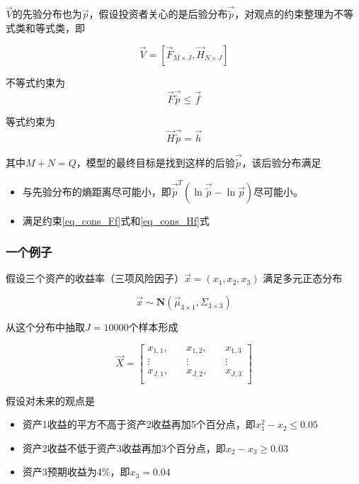 $\vec{V}$的先验分布也为$\vec{p}$，假设投资者关心的是后验分布$\vec{\tilde{p}}$，对观点的约束整理为不等式类和等式类，即

\begin{equation}
    \vec{V} = [\vec{F}_{M\times J}, \vec{H}_{N\times J}]
\end{equation}

不等式约束为
\begin{equation}\label{eq_cons_Ff}
    \vec{F}\vec{\tilde{p}} \leq \vec{f}
\end{equation}

等式约束为
\begin{equation}\label{eq_cons_Hf}
    \vec{H}\vec{\tilde{p}} = \vec{h}
\end{equation}

其中$M+N=Q$，模型的最终目标是找到这样的后验$\vec{\tilde{p}}$，该后验分布满足
\begin{itemize}
    \item 与先验分布的熵距离尽可能小，即$\vec{\tilde{p}}^T(\ln\vec{\tilde{p}}-\ln\vec{p})$尽可能小。
    \item 满足约束\ref{eq_cons_Ff}式和\ref{eq_cons_Hf}式
\end{itemize}

\subsubsection{一个例子}
假设三个资产的收益率（三项风险因子）$\vec{x}=(x_1,x_2,x_3)$ 满足多元正态分布

\begin{equation}
    \vec{x} \sim \mathbf{N}(\vec{\mu}_{3\times1}, \Sigma_{3\times3})
\end{equation}

从这个分布中抽取$J=10000$个样本形成

\begin{equation}
    \vec{X} = \left[
        \begin{aligned}
            x_{1,1}, & \quad x_{1,2}, & \quad x_{1,3} \\
            \vdots   & \quad \vdots   & \quad \vdots  \\
            x_{J,1}, & \quad x_{J,2}, & \quad x_{J,3} \\
        \end{aligned}
        \right]
\end{equation}

假设对未来的观点是

\begin{itemize}
    \item 资产1收益的平方不高于资产2收益再加5个百分点，即$x_1^2 - x_2 \leq 0.05$
    \item 资产2收益不低于资产3收益再加3个百分点，即$x_2 - x_3 \geq 0.03$
    \item 资产3预期收益为4\%，即$x_3 = 0.04$
\end{itemize}

